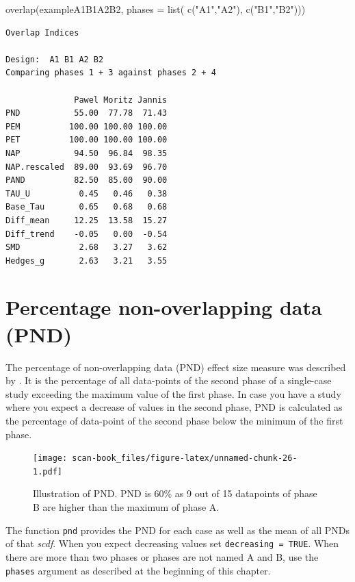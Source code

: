 \documentclass[
]{book}
\newenvironment{Shaded}{\begin{snugshade}}{\end{snugshade}}
\newcommand{\AttributeTok}[1]{\textcolor[rgb]{0.77,0.63,0.00}{#1}}
\newcommand{\FunctionTok}[1]{\textcolor[rgb]{0.00,0.00,0.00}{#1}}
\newcommand{\NormalTok}[1]{#1}
\newcommand{\StringTok}[1]{\textcolor[rgb]{0.31,0.60,0.02}{#1}}
\begin{document}
\begin{Shaded}
\begin{Highlighting}[]
\FunctionTok{overlap}\NormalTok{(exampleA1B1A2B2, }\AttributeTok{phases =} \FunctionTok{list}\NormalTok{( }\FunctionTok{c}\NormalTok{(}\StringTok{"A1"}\NormalTok{,}\StringTok{"A2"}\NormalTok{), }\FunctionTok{c}\NormalTok{(}\StringTok{"B1"}\NormalTok{,}\StringTok{"B2"}\NormalTok{)))}
\end{Highlighting}
\end{Shaded}

\begin{verbatim}
Overlap Indices

Design:  A1 B1 A2 B2 
Comparing phases 1 + 3 against phases 2 + 4 

              Pawel Moritz Jannis
PND           55.00  77.78  71.43
PEM          100.00 100.00 100.00
PET          100.00 100.00 100.00
NAP           94.50  96.84  98.35
NAP.rescaled  89.00  93.69  96.70
PAND          82.50  85.00  90.00
TAU_U          0.45   0.46   0.38
Base_Tau       0.65   0.68   0.68
Diff_mean     12.25  13.58  15.27
Diff_trend    -0.05   0.00  -0.54
SMD            2.68   3.27   3.62
Hedges_g       2.63   3.21   3.55
\end{verbatim}

\hypertarget{percentage-non-overlapping-data-pnd}{%
\section{Percentage non-overlapping data (PND)}\label{percentage-non-overlapping-data-pnd}}

The percentage of non-overlapping data (PND) effect size measure was described by \citet{scruggs_quantitative_1987} . It is the percentage of all data-points of the second phase of a single-case study exceeding the maximum value of the first phase. In case you have a study where you expect a decrease of values in the second phase, PND is calculated as the percentage of data-point of the second phase below the minimum of the first phase.

\begin{figure}
\centering
\texttt{[image: scan-book\_files/figure-latex/unnamed-chunk-26-1.pdf]}
\caption{\label{fig:unnamed-chunk-26}Illustration of PND. PND is 60\% as 9 out of 15 datapoints of phase B are higher than the maximum of phase A.}
\end{figure}

The function \texttt{pnd} provides the PND for each case as well as the mean of all PNDs of that \emph{scdf}. When you expect decreasing values set \texttt{decreasing\ =\ TRUE}. When there are more than two phases or phases are not named A and B, use the \texttt{phases} argument as described at the beginning of this chapter.
\end{document}
